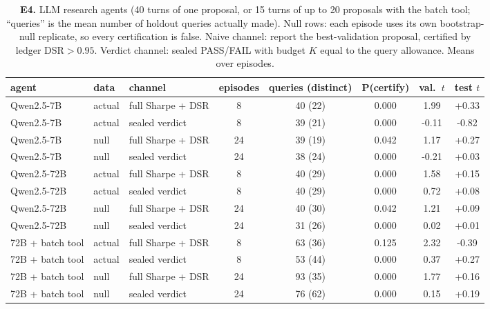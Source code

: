 \begin{table}[t]\centering\small
\caption{\textbf{E4.} LLM research agents (40 turns of one proposal, or 15 turns of up to 20 proposals with the batch tool; ``queries'' is the mean number of holdout queries actually made). Null rows: each episode uses its own bootstrap-null replicate, so every certification is false. Naive channel: report the best-validation proposal, certified by ledger DSR$>0.95$. Verdict channel: sealed PASS/FAIL with budget $K$ equal to the query allowance. Means over episodes.}\label{tab:e4}
\begin{tabular}{ll l cc ccc}\toprule
agent & data & channel & episodes & queries (distinct) & P(certify) & val.\ $t$ & test $t$\\\midrule
Qwen2.5-7B & actual & full Sharpe + DSR & 8 & 40 (22) & 0.000 & 1.99 & +0.33\\
Qwen2.5-7B & actual & sealed verdict & 8 & 39 (21) & 0.000 & -0.11 & -0.82\\
Qwen2.5-7B & null & full Sharpe + DSR & 24 & 39 (19) & 0.042 & 1.17 & +0.27\\
Qwen2.5-7B & null & sealed verdict & 24 & 38 (24) & 0.000 & -0.21 & +0.03\\
\midrule
Qwen2.5-72B & actual & full Sharpe + DSR & 8 & 40 (29) & 0.000 & 1.58 & +0.15\\
Qwen2.5-72B & actual & sealed verdict & 8 & 40 (29) & 0.000 & 0.72 & +0.08\\
Qwen2.5-72B & null & full Sharpe + DSR & 24 & 40 (30) & 0.042 & 1.21 & +0.09\\
Qwen2.5-72B & null & sealed verdict & 24 & 31 (26) & 0.000 & 0.02 & +0.01\\
\midrule
72B + batch tool & actual & full Sharpe + DSR & 8 & 63 (36) & 0.125 & 2.32 & -0.39\\
72B + batch tool & actual & sealed verdict & 8 & 53 (44) & 0.000 & 0.37 & +0.27\\
72B + batch tool & null & full Sharpe + DSR & 24 & 93 (35) & 0.000 & 1.77 & +0.16\\
72B + batch tool & null & sealed verdict & 24 & 76 (62) & 0.000 & 0.15 & +0.19\\
\bottomrule\end{tabular}\end{table}
